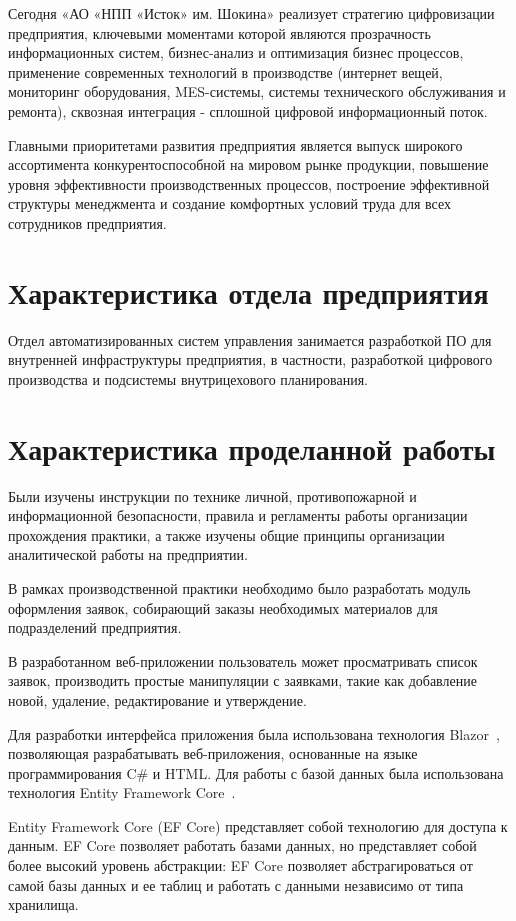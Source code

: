 \documentclass[a4paper,14pt]{extreport}
\begin{document}
	Сегодня «АО «НПП «Исток» им. Шокина» реализует стратегию цифровизации предприятия, ключевыми моментами которой являются прозрачность информационных систем, бизнес-анализ и оптимизация бизнес процессов, применение современных технологий в производстве (интернет вещей, мониторинг оборудования, MES-системы, системы технического обслуживания и ремонта), сквозная интеграция - сплошной цифровой информационный поток.
	
	Главными приоритетами развития предприятия является выпуск широкого ассортимента конкурентоспособной на мировом рынке продукции, повышение уровня эффективности производственных процессов, построение эффективной структуры менеджмента и создание комфортных условий труда для всех сотрудников предприятия.
	\newpage
	\section{Характеристика отдела предприятия} 
	
	Отдел автоматизированных систем управления занимается разработкой ПО для внутренней инфраструктуры предприятия, в частности, разработкой цифрового производства и подсистемы внутрицехового планирования.
	
	\section{Характеристика проделанной работы}
	Были изучены инструкции по технике личной, противопожарной и информационной безопасности, правила и регламенты работы организации прохождения практики, а также изучены общие принципы организации аналитической работы на предприятии.
	
	В рамках производственной практики необходимо было разработать модуль оформления заявок, собирающий заказы необходимых материалов для подразделений предприятия.
	
	В разработанном веб-приложении пользователь может просматривать список заявок, производить простые манипуляции с заявками, такие как добавление новой, удаление, редактирование и утверждение. 
	
	Для разработки интерфейса приложения была использована технология Blazor~\cite{blazor}, позволяющая разрабатывать веб-приложения, основанные на языке программирования C\# и HTML. Для работы с базой данных была использована технология Entity Framework Core~\cite{efcore}. 
	
	Entity Framework Core (EF Core) представляет собой технологию для доступа к данным. EF Core позволяет работать базами данных, но представляет собой более высокий уровень абстракции: EF Core позволяет абстрагироваться от самой базы данных и ее таблиц и работать с данными независимо от типа хранилища.
	
\end{document}
